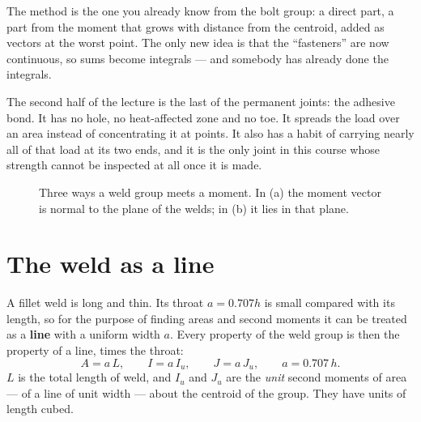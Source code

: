 \documentclass[11pt,a4paper]{article}
\begin{document}
\medskip
The method is the one you already know from the bolt group: a direct part, a part from the moment
that grows with distance from the centroid, added as vectors at the worst point. The only new idea
is that the ``fasteners'' are now continuous, so sums become integrals --- and somebody has already
done the integrals.

\medskip
The second half of the lecture is the last of the permanent joints: the adhesive bond. It has no
hole, no heat-affected zone and no toe. It spreads the load over an area instead of concentrating
it at points. It also has a habit of carrying nearly all of that load at its two ends, and it is
the only joint in this course whose strength cannot be inspected at all once it is made.

\begin{figure}[H]\centering
\resizebox{\textwidth}{!}{}
\caption{Three ways a weld group meets a moment. In (a) the moment vector is normal to the plane
of the welds; in (b) it lies in that plane.}
\label{fig:cases}
\end{figure}

\section{The weld as a line}
\label{sec:line}

A fillet weld is long and thin. Its throat $a=0.707h$ is small compared with its length, so for
the purpose of finding areas and second moments it can be treated as a \textbf{line} with a
uniform width $a$. Every property of the weld group is then the property of a line, times the
throat:
\begin{equation}
A = a\,L,\qquad I = a\,I_u,\qquad J = a\,J_u,\qquad a=0.707\,h .
\label{eq:unit}
\end{equation}
$L$ is the total length of weld, and $I_u$ and $J_u$ are the \emph{unit} second moments of area
--- of a line of unit width --- about the centroid of the group. They have units of length cubed.
\end{document}
